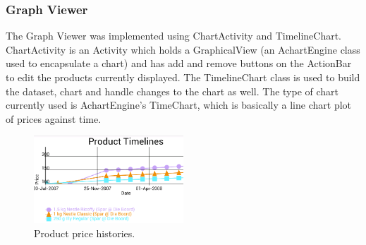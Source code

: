\subsubsection{Graph Viewer}
The Graph Viewer was implemented using ChartActivity and TimelineChart.
ChartActivity is an Activity which holds a GraphicalView (an AchartEngine class
used to encapsulate a chart) and has add and remove buttons on the ActionBar to
edit the products currently displayed. The TimelineChart class is used to build
the dataset, chart and handle changes to the chart as well. The type of chart
currently used is AchartEngine's TimeChart, which is basically a line chart plot
of prices against time. 
\begin{figure}[h!]
\centering
\includegraphics[width=0.5\textwidth]{graph.png}
\caption{Product price histories.}
\end{figure}

